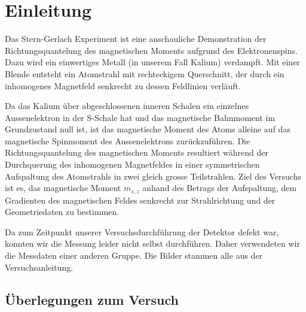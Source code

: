 \documentclass[a4paper,parskip,11pt, DIV12]{scrreprt}
\begin{document}
\fancyfoot{}
\fancyfoot[R]{\small \thepage}
\fancyfoot[L]{}
\fancyfoot[C]{}
\renewcommand{\footrulewidth}{0.4pt} 

\addtolength{\headheight}{2\baselineskip}
\addtolength{\headheight}{0.6pt}


\renewcommand{\headrulewidth}{0.6pt}
\renewcommand{\footrulewidth}{0.4pt}

\renewcommand{\chaptermark}[1]{ \markboth{#1}{} } %


\tableofcontents

\chapter{Einleitung}

Das Stern-Gerlach Experiment ist eine anschauliche Demonstration der Richtungsquantelung des magnetischen Moments aufgrund des Elektronenspins. Dazu wird ein einwertiges Metall (in unserem Fall Kalium) verdampft. Mit einer Blende entsteht ein Atomstrahl mit rechteckigem Querschnitt, der durch ein inhomogenes Magnetfeld senkrecht zu dessen Feldlinien verläuft. 
 
 Da das Kalium über abgeschlossenen inneren Schalen ein einzelnes Aussenelektron in der S-Schale hat und das magnetische Bahnmoment im Grundzustand null ist, ist das magnetische Moment des Atoms alleine auf das magnetische Spinmoment des Aussenelektrons zurückzuführen. Die Richtungsquantelung des magnetischen Moments resultiert während der Durchquerung des inhomogenen Magnetfeldes in einer symmetrischen Aufspaltung des Atomstrahls in zwei gleich grosse Teilstrahlen. Ziel des Versuchs ist es, das magnetische Moment $m_{s,z}$ anhand des Betrags der Aufspaltung, dem Gradienten des magnetischen Feldes senkrecht zur Strahlrichtung und der Geometriedaten zu bestimmen.
 
 Da zum Zeitpunkt unserer Versuchsdurchführung der Detektor defekt war, konnten wir die Messung leider nicht selbst durchführen. Daher verwendeten wir die Messdaten einer anderen Gruppe. Die Bilder stammen alle aus der Versuchsanleitung.
 
 \section{Überlegungen zum Versuch}
 
\end{document}
